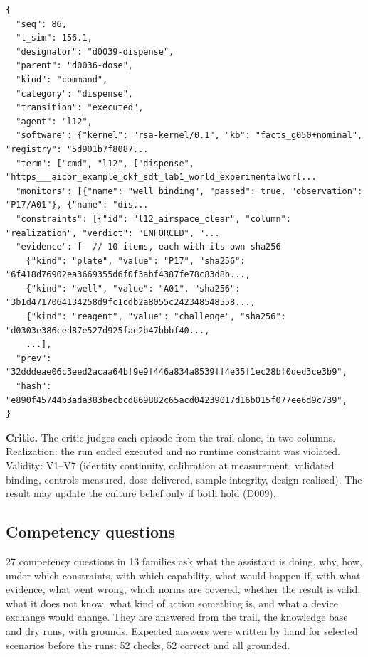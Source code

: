 \documentclass[10pt,a4paper]{article}
\begin{document}
\begin{listing}[tbp]
\begin{Verbatim}[fontsize=\footnotesize,breaklines,frame=lines,framesep=2mm]
{
  "seq": 86,
  "t_sim": 156.1,
  "designator": "d0039-dispense",
  "parent": "d0036-dose",
  "kind": "command",
  "category": "dispense",
  "transition": "executed",
  "agent": "l12",
  "software": {"kernel": "rsa-kernel/0.1", "kb": "facts_g050+nominal", "registry": "5d901b7f8087...
  "term": ["cmd", "l12", ["dispense", "https___aicor_example_okf_sdt_lab1_world_experimentalworl...
  "monitors": [{"name": "well_binding", "passed": true, "observation": "P17/A01"}, {"name": "dis...
  "constraints": [{"id": "l12_airspace_clear", "column": "realization", "verdict": "ENFORCED", "...
  "evidence": [  // 10 items, each with its own sha256
    {"kind": "plate", "value": "P17", "sha256": "6f418d76902ea3669355d6f0f3abf4387fe78c83d8b...,
    {"kind": "well", "value": "A01", "sha256": "3b1d4717064134258d9fc1cdb2a8055c242348548558...,
    {"kind": "reagent", "value": "challenge", "sha256": "d0303e386ced87e527d925fae2b47bbbf40...,
    ...],
  "prev": "32dddeae06c3eed2acaa64bf9e9f446a834a8539ff4e35f1ec28bf0ded3ce3b9",
  "hash": "e890f45744b3ada383becbcd869882c65acd04239017d16b015f077ee6d9c739",
}
\end{Verbatim}
\caption{An audit entry of the nominal trail (a dispense), abbreviated.}\label{lst:audit}
\end{listing}

\textbf{Critic.} The critic judges each episode from the trail alone, in two columns. Realization: the run ended executed and no runtime constraint was violated. Validity: V1–V7 (identity continuity, calibration at measurement, validated binding, controls measured, dose delivered, sample integrity, design realised). The result may update the culture belief only if both hold (D009).

\subsection{Competency questions}\label{sec:cq}

27 competency questions in 13 families ask what the assistant is doing, why, how, under which constraints, with which capability, what would happen if, with what evidence, what went wrong, which norms are covered, whether the result is valid, what it does not know, what kind of action something is, and what a device exchange would change. They are answered from the trail, the knowledge base and dry runs, with grounds. Expected answers were written by hand for selected scenarios before the runs: 52 checks, 52 correct and all grounded.
\end{document}

